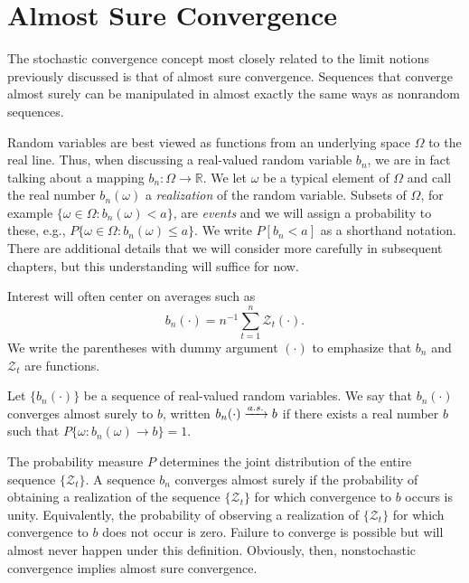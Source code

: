 \section{Almost Sure Convergence}\label{sec:as-convergence}

The stochastic convergence concept most closely related to the limit notions
previously discussed is that of almost sure convergence. Sequences that
converge almost surely can be manipulated in almost exactly the same
ways as nonrandom sequences.

Random variables are best viewed as functions from an underlying space
$\Omega$ to the real line. Thus, when discussing a real-valued random variable $b_n$,
we are in fact talking about a mapping $b_n : \Omega \to \mathbb{R}$. We let $\omega$ be a typical
element of $\Omega$ and call the real number $b_n(\omega)$ a \emph{realization} of the random
variable. Subsets of $\Omega$, for example $\{\omega \in \Omega : b_n(\omega) < a\}$, are \emph{events} and
we will assign a probability to these, e.g., $P\{\omega \in \Omega : b_n(\omega) \leq a\}$. We write
$P[b_n < a]$ as a shorthand notation. There are additional details that we
will consider more carefully in subsequent chapters, but this understanding
will suffice for now.

Interest will often center on averages such as
\[
b_n(\cdot) = n^{-1} \sum_{t=1}^n \mathcal{Z}_t(\cdot).
\]
We write the parentheses with dummy argument $(\cdot)$ to emphasize that $b_n$
and $\mathcal{Z}_t$ are functions.

\begin{definition}\label{def:as-convergence}
Let $\{b_n(\cdot)\}$ be a sequence of real-valued random variables.
We say that $b_n(\cdot)$ converges almost surely to $b$, written $b_n(\cdot) \xrightarrow{a.s.} b$ if there
exists a real number $b$ such that $P\{\omega : b_n(\omega) \to b\} = 1$.
\end{definition}

The probability measure $P$ determines the joint distribution of the entire
sequence $\{\mathcal{Z}_t\}$. A sequence $b_n$ converges almost surely if the probability of
obtaining a realization of the sequence $\{\mathcal{Z}_t\}$ for which convergence to $b$
occurs is unity. Equivalently, the probability of observing a realization of
$\{\mathcal{Z}_t\}$ for which convergence to $b$ does not occur is zero. Failure to converge
is possible but will almost never happen under this definition. Obviously,
then, nonstochastic convergence implies almost sure convergence.


